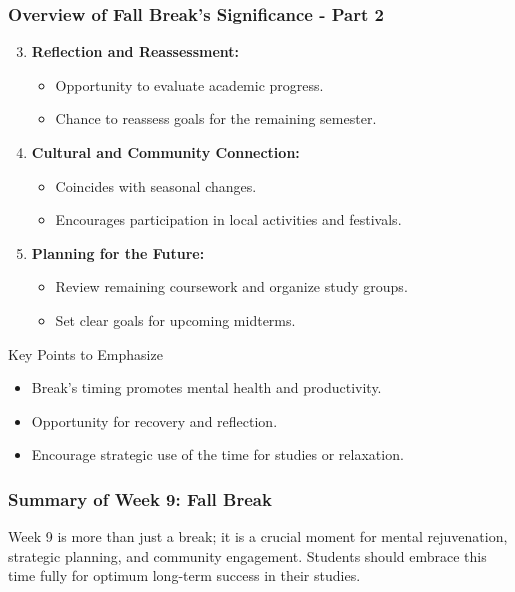 \documentclass[aspectratio=169]{beamer}
\begin{document}
\begin{frame}[fragile]
    \frametitle{Overview of Fall Break's Significance - Part 2}
    \begin{enumerate}\setcounter{enumi}{2}
        \item \textbf{Reflection and Reassessment:}
        \begin{itemize}
            \item Opportunity to evaluate academic progress.
            \item Chance to reassess goals for the remaining semester.
        \end{itemize}

        \item \textbf{Cultural and Community Connection:}
        \begin{itemize}
            \item Coincides with seasonal changes.
            \item Encourages participation in local activities and festivals.
        \end{itemize}

        \item \textbf{Planning for the Future:}
        \begin{itemize}
            \item Review remaining coursework and organize study groups.
            \item Set clear goals for upcoming midterms.
        \end{itemize}
    \end{enumerate}

    \begin{block}{Key Points to Emphasize}
        \begin{itemize}
            \item Break's timing promotes mental health and productivity.
            \item Opportunity for recovery and reflection.
            \item Encourage strategic use of the time for studies or relaxation.
        \end{itemize}
    \end{block}
\end{frame}

\begin{frame}[fragile]
    \frametitle{Summary of Week 9: Fall Break}
    Week 9 is more than just a break; it is a crucial moment for mental rejuvenation, strategic planning, and community engagement. 
    Students should embrace this time fully for optimum long-term success in their studies.
\end{frame}
\end{document}
